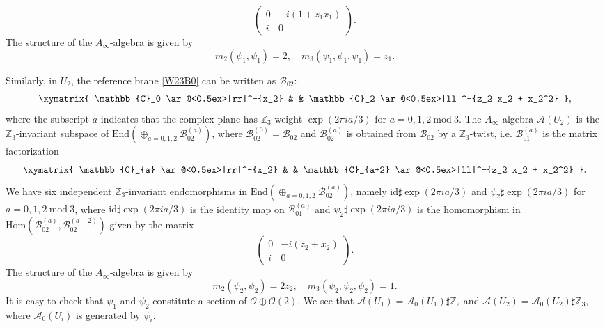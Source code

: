 \documentclass[a4paper,11pt]{article}
\numberwithin{equation}{section}
\begin{document}
\[ \left(
\begin{array}{cc}
0 & -i (1+z_1 x_1) \\ i & 0
\end{array} \right).
\]
The structure of the $A_\infty$-algebra is given by
\[
m_2(\psi_1,\psi_1) = 2,\quad m_3(\psi_1,\psi_1,\psi_1) = z_1.
\]

Similarly, in $U_2$, the reference brane \eqref{W23B0} can be written as $\mathcal{B}_{02}$:
\[
\xymatrix{
	\mathbb{C}_0 \ar@<0.5ex>[rr]^-{x_2} & &
\mathbb{C}_2 \ar@<0.5ex>[ll]^-{z_2 x_2 + x_2^2}
},
\]
where the subscript $a$ indicates that the complex plane has 
$\mathbb{Z}_3$-weight $\exp(2 \pi i a /3)$ for $a=0,1,2 \mathrm{ \ mod \ } 3$. 
The $A_\infty$-algebra $\mathcal{A}(U_2)$ is the $\mathbb{Z}_3$-invariant 
subspace of $\mathrm{End}(\oplus_{a=0,1,2} \mathcal{B}_{02}^{(a)})$, where 
$\mathcal{B}_{02}^{(0)} = \mathcal{B}_{02}$ and $\mathcal{B}_{02}^{(a)}$ is 
obtained from $\mathcal{B}_{02}$ by a $\mathbb{Z}_3$-twist, i.e. 
$\mathcal{B}_{01}^{(a)}$ is the matrix factorization
\[
\xymatrix{
	\mathbb{C}_{a} \ar@<0.5ex>[rr]^-{x_2} & &
\mathbb{C}_{a+2} \ar@<0.5ex>[ll]^-{z_2 x_2 + x_2^2}
}.
\]
We have six independent $\mathbb{Z}_3$-invariant endomorphisms in 
$\mathrm{End}(\oplus_{a=0,1,2} \mathcal{B}_{02}^{(a)})$, namely $\mathrm{id} 
\sharp \exp(2 \pi i a /3)$ and $\psi_2 \sharp \exp(2 \pi i a /3)$ for $a = 0,1,2 
\mathrm{ \ mod \ } 3$, where $\mathrm{id} \sharp \exp(2 \pi i a /3)$ is the 
identity map on $\mathcal{B}_{01}^{(a)}$ and $\psi_2 \sharp \exp(2 \pi i a /3)$ 
is  the homomorphism in $\mathrm{Hom}(\mathcal{B}_{02}^{(a)}, 
\mathcal{B}_{02}^{(a+2)})$ given by the matrix
\[ \left(
\begin{array}{cc}
0 & -i (z_2 + x_2) \\ i & 0
\end{array} \right).
\]
The structure of the $A_\infty$-algebra is given by
\[
m_2(\psi_2,\psi_2) = 2 z_2,\quad m_3(\psi_2,\psi_2,\psi_2) = 1.
\]
It is easy to check that $\psi_1$ and $\psi_2$ constitute a section of 
$\mathcal{O} \oplus \mathcal{O}(2)$. We see that $\mathcal{A}(U_1) = 
\mathcal{A}_0(U_1) \sharp \mathbb{Z}_2$ and $\mathcal{A}(U_2) = 
\mathcal{A}_0(U_2) \sharp \mathbb{Z}_3$, where $\mathcal{A}_0(U_i)$ is generated 
by $\psi_i$.
\end{document}

